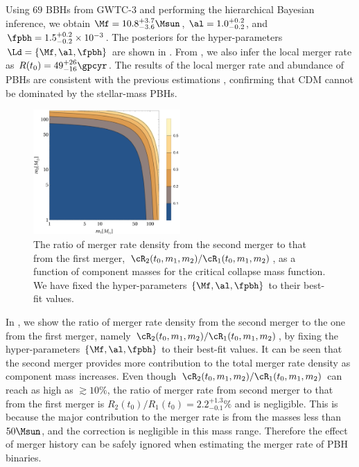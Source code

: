 \documentclass[
reprint,           %
superscriptaddress,%
amsmath,           %
amssymb,           %
aps,               %
prd,               %
notitlepage,       %
longbibliography,  %
floatfix,          %
nofootinbib,
]{revtex4-1}
\begin{document}
Using $69$ BBHs from GWTC-3 and performing the hierarchical Bayesian inference, we obtain $\Mf = 10.8^{+3.7}_{-3.6} \Msun$, $\al = 1.0^{+0.2}_{-0.2}$, and $\fpbh = 1.5^{+0.2}_{-0.2} \times 10^{-3}$. The posteriors for the hyper-parameters $\Ld = \{\Mf, \al, \fpbh\}$ are shown in . From , we also infer the local merger rate as $R(t_0) = 49^{+26}_{-16} \gpcyr$. The results of the local merger rate and abundance of PBHs are consistent with the previous estimations \cite{Sasaki:2016jop,Ali-Haimoud:2017rtz,Chen:2018czv,Chen:2018rzo,Chen:2019irf,Wu:2020drm,Chen:2021nxo,Chen:2022fda,Zheng:2022wqo}, confirming that CDM cannot be dominated by the stellar-mass PBHs. 


\begin{figure}[tbp!]
	\centering
	\includegraphics[width=0.5\textwidth]{ratio-CC.pdf}
	\caption{\label{ratio-CC}The ratio of merger rate density from the second merger to that from the first merger, $\cR_2(t_0, m_1, m_2)/\cR_1(t_0, m_1, m_2)$, as a function of component masses for the critical collapse mass function. We have fixed the hyper-parameters $\{\Mf, \al, \fpbh\}$ to their best-fit values.}
\end{figure}

In , we show the ratio of merger rate density from the second merger to the one from the first merger, namely $\cR_2(t_0, m_1, m_2)/\cR_1(t_0, m_1, m_2)$, by fixing the hyper-parameters $\{\Mf, \al, \fpbh\}$ to their best-fit values. It can be seen that the second merger provides more contribution to the total merger rate density as component mass increases. Even though $\cR_2(t_0, m_1, m_2)/\cR_1(t_0, m_1, m_2)$ can reach as high as $\gtrsim 10\%$, the ratio of merger rate from second merger to that from the first merger is $R_2(t_0)/R_1(t_0) = 2.2^{+1.3}_{-0.1}\%$ and is negligible. This is because the major contribution to the merger rate is from the masses less than $50\Msun$, and the correction is negligible in this mass range. Therefore the effect of merger history can be safely ignored when estimating the merger rate of PBH binaries.
\end{document}
